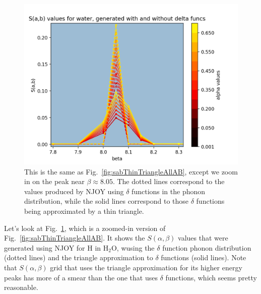 \documentclass[10pt]{article}
\begin{document}
\begin{multicols}{2}
            \begin{figure}[H]
              \begin{center}
              \includegraphics[scale=0.6]{sab_thinTriangle_and_delta_all_AB_Zoomed}
                \caption{This is the same as Fig.~\ref{fig:sabThinTriangleAllAB}, except we zoom in on the peak near $\beta\approx8.05$. The dotted lines correspond to the values produced by NJOY using $\delta$ functions in the phonon distribution, while the solid lines correspond to those $\delta$ functions being approximated by a thin triangle.}
              \label{fig:sabThinTriangleAllABZoomed}
              \end{center}
            \end{figure}


            Let's look at Fig.~\ref{fig:sabThinTriangleAllABZoomed}, which is a zoomed-in version of Fig.~\ref{fig:sabThinTriangleAllAB}. It shows the $S(\alpha,\beta)$ values that were generated using NJOY for H in H$_2$O, wusing the $\delta$ function phonon distribution (dotted lines) and the triangle approximation to $\delta$ functions (solid lines). Note that $S(\alpha,\beta)$ grid that uses the triangle approximation for its higher energy peaks has more of a smear than the one that uses $\delta$ functions, which seems pretty reasonable.


\end{multicols}
\end{document}
